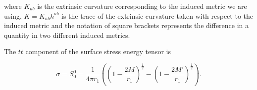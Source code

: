 \documentclass[aps,showpacs,twocolumn,floats,prd,superscriptaddress,nofootinbib]{revtex4-1}
\begin{document}
where $K_{ab}$ is the extrinsic curvature corresponding to the induced metric we are using, $K = K_{ab} h^{ab}$ is the trace of the extrinsic curvature taken with respect to the induced metric and the notation of square brackets represents the difference in a quantity in two different induced metrics. 
%
%
%
%
%
%
%
%
%

The $tt$ component of the surface stress energy tensor is

\begin{equation}
	\sigma = S^0_0 =  \frac{1}{4 \pi r_1} \left( \left( 1 - \frac{2M}{r_1} \right)^\frac{1}{2} - \left( 1 - \frac{2M'}{r_1} \right)^\frac{1}{2} \right).	\label{sig}
\end{equation}

%
\end{document}
